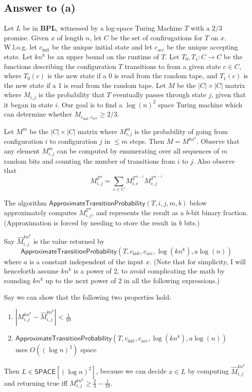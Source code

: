 \documentclass{article}
\def \SPACE{{\mathsf{SPACE}}}
\def \BPL{{\mathbf{BPL}}}
\begin{document}
\subsection*{Answer to (a)}

Let $L$ be in $\BPL$, witnessed by a log-space Turing Machine $T$ with a $2/3$ promise.
Given $x$ of length $n$, let $C$ be the set of confirugations for $T$ on $x$.
W.l.o.g. let $c_\text{init}$ be the unique initial state and let $c_\text{acc}$ be the unique accepting state.
Let $kn^k$ be an upper bound on the runtime of $T$.
Let $T_0, T_1 : C \to C$ be the functions describing the configuration $T$ transitions to from a given state $c \in C$, where $T_0(c)$ is the new state if a 0 is read from the random tape, and $T_1(c)$ is the new state if a 1 is read from the random tape.
Let $M$ be the $|C| \times |C|$ matrix where $M_{i, j}$ is the probability that $T$ eventually passes through state $j$, given that it began in state $i$.
Our goal is to find a $\log(n)^2$ space Turing machine which can determine whether $M_{c_\text{init}, c_\text{acc}} \geq 2/3$.

Let $M^m$ be the $|C| \times |C|$ matrix where $M^m_{i, j}$ is the probability of going from configuration $i$ to configuration $j$ in $\leq m$ steps.
Then $M = M^{kn^k}$.
Observe that any element $M^m_{i, j}$ can be computed by enumerating over all sequences of $m$ random bits and counting the number of transitions from $i$ to $j$.
Also observe that
$$
M_{i, j}^{2^m} = \sum_{c \in C} M_{i, c}^{2^{m-1}} M_{c, j}^{2^{m-1}}
$$

The algorithm $\mathsf{ApproximateTransitionProbability}(T, i, j, m, b)$ below approximately computes $M_{i, j}^{2^m}$, and represents the result
as a $b$-bit binary fraction.
(Approximation is forced by needing to store the result in $b$ bits.)

Say $\hat{M}_{i, j}^{kn^k}$ is the value returned by
$$\mathsf{ApproximateTransitionProbability}(T, c_\text{init}, c_\text{acc}, \log(kn^k), a \log(n))$$
where $a$ is a constant independent of the input $x$.
(Note that for simplicity, I will henceforth assume $kn^k$ is a power of 2, to avoid complicating the math by rounding $kn^k$ up to the next power of 2 in all the following expressions.)

Say we can show that the following two properties hold:
\begin{enumerate}
	\item $|M_{i, j}^{kn^k} - \hat{M}_{i, j}^{kn^k}| < \frac{1}{10}$
	\item $\mathsf{ApproximateTransitionProbability}(T, c_\text{init}, c_\text{acc}, \log(kn^k), a \log(n))$ \\
	uses $O((\log n)^2)$ space
\end{enumerate}
Then $L \in \SPACE[(\log n)^2]$, because we can decide $x \in L$ by computing $\hat{M}_{i, j}^{kn^k}$ and returning true iff $M_{i, j}^{kn^k} \geq \frac{2}{3} - \frac{1}{10}$.
\end{document}

